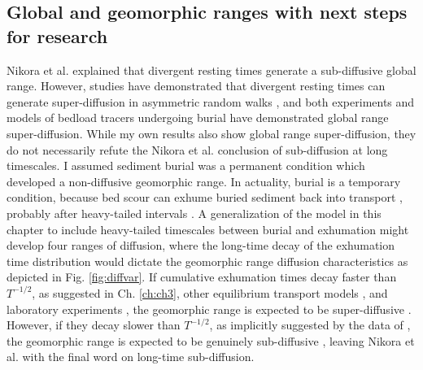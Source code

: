 \subsection{Global and geomorphic ranges with next steps for research}

Nikora et al. explained that divergent resting times generate a sub-diffusive global range.
However, studies have demonstrated that divergent resting times can generate super-diffusion in asymmetric random walks \citep{Weeks1996,Weeks1998}, and both experiments \citep{Bradley2017,Bradley2010} and models \citep{Pelosi2016,Wu2019,Wu2019a} of bedload tracers undergoing burial have demonstrated global range super-diffusion.
While my own results also show global range super-diffusion, they do not necessarily refute the Nikora et al. conclusion of sub-diffusion at long timescales.
I assumed sediment burial was a permanent condition which developed a non-diffusive geomorphic range.
In actuality, burial is a temporary condition, because bed scour can exhume buried sediment back into transport \citep{Wu2019a}, probably after heavy-tailed intervals \citep{Voepel2013,Martin2014}.
A generalization of the model in this chapter to include heavy-tailed timescales between burial and exhumation might develop four ranges of diffusion, where the long-time decay of the exhumation time distribution would dictate the geomorphic range diffusion characteristics as depicted in Fig. \ref{fig:diffvar}.
If cumulative exhumation times decay faster than $T^{-1/2}$, as suggested in Ch. \ref{ch:ch3}, other equilibrium transport models \citep{Voepel2013, Martin2014}, and laboratory experiments \citep{Martin2014,Martin2012}, the geomorphic range is expected to be super-diffusive \citep{Weeks1998}.
However, if they decay slower than $T^{-1/2}$, as implicitly suggested by the data of \citet{Olinde2015}, the geomorphic range is expected to be genuinely sub-diffusive \citep{Weeks1998}, leaving Nikora et al. with the final word on long-time sub-diffusion.

